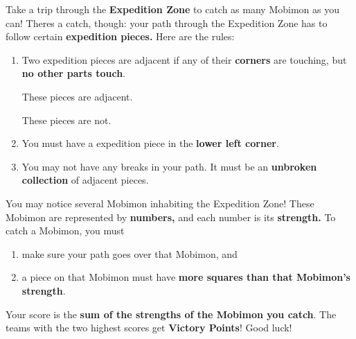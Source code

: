 

Take a trip through the \textbf{Expedition Zone} to catch as many Mobimon as you
can! Theres a catch, though: your path through the Expedition Zone has to follow
certain \textbf{expedition pieces.} Here are the rules:
\begin{enumerate}
\item Two expedition pieces are adjacent if any of their \textbf{corners} are
  touching, but \textbf{no other parts touch}.
  \begin{center}
    These pieces are adjacent.

  \end{center}

  \begin{center}
    These pieces are not.

  \end{center}

\item You must have a expedition piece in the \textbf{lower left corner}.
\item You may not have any breaks in your path. It must be an \textbf{unbroken
    collection} of adjacent pieces.
\end{enumerate}

You may notice several Mobimon inhabiting the Expedition Zone! These Mobimon are
represented by \textbf{numbers,} and each number is its \textbf{strength.} To
catch a Mobimon, you must

\begin{enumerate}
\item make sure your path goes over that Mobimon, and
\item a piece on that Mobimon must have \textbf{more squares than that Mobimon's
  strength}.
\end{enumerate}

Your score is the \textbf{sum of the strengths of the Mobimon you catch}. The
teams with the two highest scores get \textbf{Victory Points}! Good luck!

